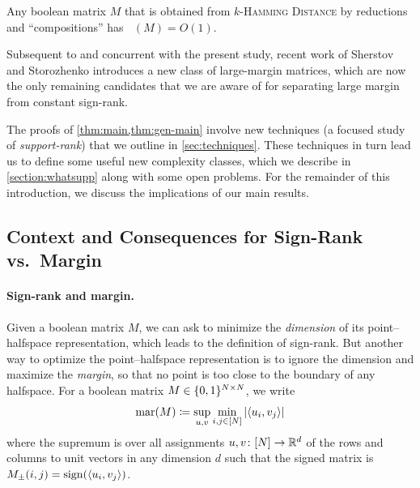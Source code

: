 \documentclass{article}
\DeclareMathOperator{\signrank}{rank_\pm}
\DeclareMathOperator{\margin}{\mathrm{mar}}
\begin{document}
\begin{boxtheorem}
\label{thm:gen-main}
    Any boolean matrix $M$ that is obtained from \textsc{$k$-Hamming Distance} by reductions and
    ``compositions'' has $\signrank(M) = O(1)$.
\end{boxtheorem}
Subsequent to \cite{FGHH25} and concurrent with the present study, recent work
of Sherstov and Storozhenko \cite{SS24} introduces a new class of large-margin
matrices, which are now the only remaining candidates that we are aware of for
separating large margin from constant sign-rank.

The proofs of \cref{thm:main,thm:gen-main} involve new techniques (a focused
study of \emph{support-rank}) that we outline in \cref{sec:techniques}. These
techniques in turn lead us to define some useful new complexity classes, which
we describe in \cref{section:whatsupp} along with some open problems. For the
remainder of this introduction, we discuss the implications of our main results.


\subsection{Context and Consequences for Sign-Rank vs.\ Margin}
\label{section:signrank-vs-margin}

\paragraph{Sign-rank and margin.}
Given a boolean matrix $M$, we can ask to minimize the \emph{dimension} of its
point--halfspace representation, which leads to the definition of sign-rank. But
another way to optimize the point--halfspace representation is to ignore the
dimension and maximize the \emph{margin}, so that no point is too close to the
boundary of any halfspace. For a boolean matrix $M \in \{0,1\}^{N \times N}$, we
write
\[
  \margin(M) \define \sup_{u,v} \min_{i,j \in [N]} |\inn{u_i, v_j}|
\]
where the supremum is over all assignments $u, v \colon [N] \to \mathbb{R}^d$ of the
rows and columns to unit vectors in any dimension $d$ such that the signed
matrix is $M_\pm(i,j) = \operatorname{sign}(\langle u_i,v_j \rangle)$.
\end{document}
